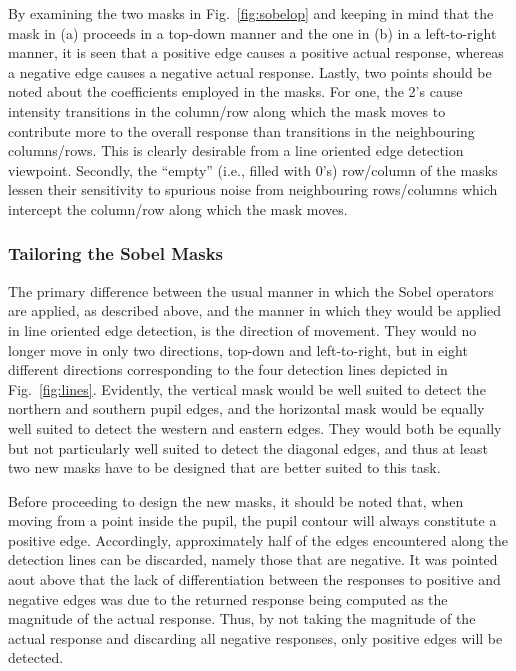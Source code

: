 By examining the two masks in Fig.~\ref{fig:sobelop} and keeping in
mind that the mask in (a) proceeds in a top-down manner and the one in
(b) in a left-to-right manner, it is seen that a positive edge causes
a positive actual response, whereas a negative edge causes a negative
actual response.  Lastly, two points should be noted about the
coefficients employed in the masks.  For one, the 2's cause intensity
transitions in the column/row along which the mask moves to contribute
more to the overall response than transitions in the neighbouring
columns/rows.  This is clearly desirable from a line oriented edge
detection viewpoint.  Secondly, the ``empty'' (i.e., filled with 0's)
row/column of the masks lessen their sensitivity to spurious noise
from neighbouring rows/columns which intercept the column/row along
which the mask moves.

\subsubsection{Tailoring the Sobel Masks}


The primary difference between the usual manner in which the Sobel
operators are applied, as described above, and the manner in which
they would be applied in line oriented edge detection, is the
direction of movement.  They would no longer move in only two
directions, top-down and left-to-right, but in eight different
directions corresponding to the four detection lines depicted in
Fig.~\ref{fig:lines}.  Evidently, the vertical mask would be well
suited to detect the northern and southern pupil edges, and the
horizontal mask would be equally well suited to detect the western and
eastern edges.  They would both be equally but not particularly well
suited to detect the diagonal edges, and thus at least two new masks
have to be designed that are better suited to this task.

Before proceeding to design the new masks, it should be noted that,
when moving from a point inside the pupil, the pupil contour will
always constitute a positive edge.  Accordingly, approximately half of
the edges encountered along the detection lines can be discarded,
namely those that are negative.  It was pointed aout above that the
lack of differentiation between the responses to positive and negative
edges was due to the returned response being computed as the magnitude
of the actual response.  Thus, by not taking the magnitude of the
actual response and discarding all negative responses, only positive
edges will be detected.

